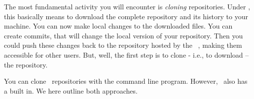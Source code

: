 %
\label{sec:gitClone}%
%
The most fundamental activity you will encounter is \emph{cloning} repositories.
Under \git, this basically means to download the complete repository and its history to your machine.
You can now make local changes to the downloaded files.
You can create commits, that will change the local version of your repository.
Then you could push these changes back to the repository hosted by the \git\ , making them accessible for other users.
But, well, the first step is to clone - i.e., to download -- the repository.

You can clone \git\ repositories with the command line   program.
However, \pycharm\ also has a \git {} built in.
We here outline both approaches.%
%
%
%
%
\endhsection%
